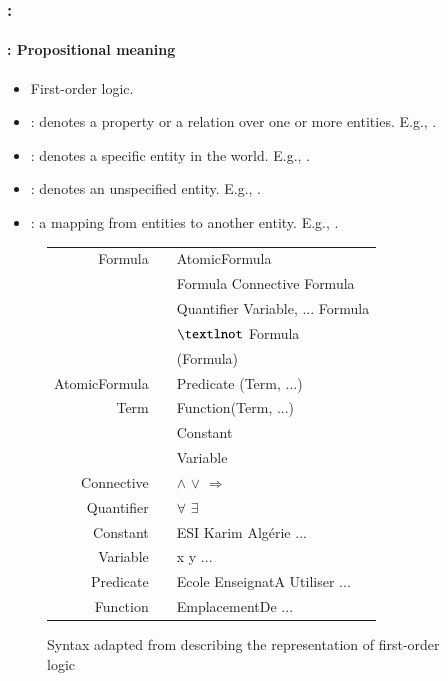 \documentclass[xcolor=table]{beamer}
\begin{document}
\begin{frame}
	\frametitle{\insertshortsubtitle: \insertsection}
	\framesubtitle{\insertsubsection: Propositional meaning}

	\begin{minipage}{0.5\textwidth}
		\begin{itemize}
			\item First-order logic.
			\item {}: denotes a property or a relation over one or more entities. 
			E.g., .	
			\item {}: denotes a specific entity in the world.
			E.g., .
			\item {}: denotes an unspecified entity. 
			E.g., .
			\item {}: a mapping from entities to another entity.
			E.g., .
		\end{itemize}
	\end{minipage}
	\begin{minipage}{0.48\textwidth}
		\begin{figure}
			{\tiny\bfseries
			\begin{tabular}{rcl}
				\hline\hline
				Formula & \textrightarrow & AtomicFormula \\
				& \textbar        & Formula Connective Formula \\
				& \textbar        & Quantifier Variable, ... Formula \\
				& \textbar        & $\textlnot$ Formula \\
				& \textbar        & (Formula) \\
				AtomicFormula & \textrightarrow & Predicate (Term, ...) \\
				Term    & \textrightarrow & Function(Term, ...) \\
				& \textbar        & Constant \\
				& \textbar        & Variable \\
				Connective & \textrightarrow & $\wedge$ \textbar $\vee$ \textbar $\Rightarrow$ \\
				Quantifier & \textrightarrow & $\forall$ \textbar $\exists$ \\
				Constant & \textrightarrow & ESI \textbar Karim \textbar Algérie ...\\
				Variable & \textrightarrow & x \textbar y \textbar ... \\
				Predicate & \textrightarrow & Ecole \textbar EnseignatA \textbar Utiliser \textbar ... \\
				Function & \textrightarrow & EmplacementDe \textbar ... \\
				\hline\hline
			\end{tabular}
		}
			\caption{Syntax adapted from \cite{2002-russell-norvig} describing the representation of first-order logic \cite{2019-jurafsky-martin}}
		\end{figure}
	\end{minipage}

\end{frame}
\end{document}

